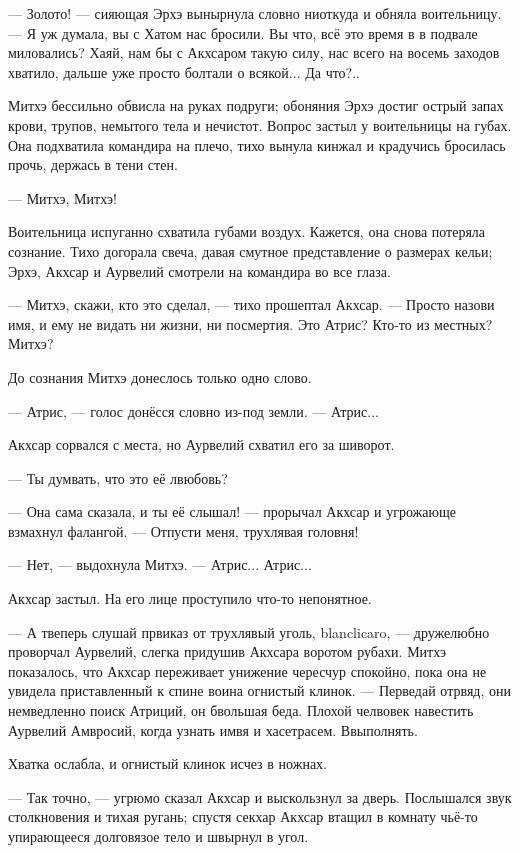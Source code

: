 --- Золото! --- сияющая Эрхэ вынырнула словно ниоткуда и обняла воительницу.
--- Я уж думала, вы с Хатом нас бросили.
Вы что, всё это время в в подвале миловались?
Хаяй, нам бы с Акхсаром такую силу, нас всего на восемь заходов хватило, дальше уже просто болтали о всякой...
Да что?..

Митхэ бессильно обвисла на руках подруги;
обоняния Эрхэ достиг острый запах крови, трупов, немытого тела и нечистот.
Вопрос застыл у воительницы на губах.
Она подхватила командира на плечо, тихо вынула кинжал и крадучись бросилась прочь, держась в тени стен.

--- Митхэ, Митхэ!

Воительница испуганно схватила губами воздух.
Кажется, она снова потеряла сознание.
Тихо догорала свеча, давая смутное представление о размерах кельи;
Эрхэ, Акхсар и Аурвелий смотрели на командира во все глаза.

--- Митхэ, скажи, кто это сделал, --- тихо прошептал Акхсар.
--- Просто назови имя, и ему не видать ни жизни, ни посмертия.
Это Атрис?
Кто-то из местных?
Митхэ?

До сознания Митхэ донеслось только одно слово.

--- Атрис, --- голос донёсся словно из-под земли.
--- Атрис...

Акхсар сорвался с места, но Аурвелий схватил его за шиворот.

--- Ты думвать, что это её лвюбовь?

--- Она сама сказала, и ты её слышал! --- прорычал Акхсар и угрожающе взмахнул фалангой.
--- Отпусти меня, трухлявая головня!

--- Нет, --- выдохнула Митхэ.
--- Атрис...
Атрис...

Акхсар застыл.
На его лице проступило что-то непонятное.

--- А твеперь слушай првиказ от трухлявый уголь, blanclicaro\FM, --- дружелюбно проворчал Аурвелий, слегка придушив Акхсара воротом рубахи.
Митхэ показалось, что Акхсар переживает унижение чересчур спокойно, пока она не увидела приставленный к спине воина огнистый клинок.
--- Перведай отрвяд, они немведленно поиск Атриций, он бвольшая беда.
Плохой челвовек навестить Аурвелий Амвросий, когда узнать имвя и хасетрасем.
Ввыполнять.

Хватка ослабла, и огнистый клинок исчез в ножнах.

--- Так точно, --- угрюмо сказал Акхсар и выскользнул за дверь.
Послышался звук столкновения и тихая ругань;
спустя секхар Акхсар втащил в комнату чьё-то упирающееся долговязое тело и швырнул в угол.


